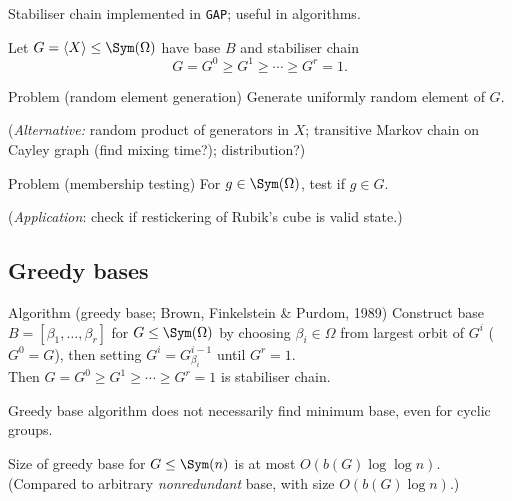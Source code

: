 \begin{slide}
    Stabiliser chain implemented in \texttt{GAP}; useful in algorithms. \pause

    Let $G = \langle X \rangle \leq \Sym(\Omega)$ have base $B$ and stabiliser chain
    $$G = G^0 \geq G^1 \geq \dotsb \geq G^r = 1.$$ \pause

    \begin{alertblock}{Problem (random element generation)}
        \vspace{0pt}
        Generate uniformly random element of $G$.

        (\textit{Alternative:} \pause random product of generators in $X$; transitive Markov chain on Cayley graph (find mixing time?); distribution?)
    \end{alertblock} \pause

    \begin{alertblock}{Problem (membership testing)}
        \vspace{0pt}
        For $g \in \Sym(\Omega)$, test if $g \in G$.

        (\textit{Application}: \pause check if restickering of Rubik's cube is valid state.)
    \end{alertblock}
\end{slide}

\subsection{Greedy bases}

\begin{slide}
    \begin{alertblock}{Algorithm (greedy base;  Brown, Finkelstein \& Purdom, 1989)}
        \vspace{0pt}
        Construct base $B = [\beta_1,\dotsc,\beta_r]$ for $G \leq \Sym(\Omega)$ by \pause choosing $\beta_i \in \Omega$ from largest orbit of $G^i$ ($G^0 = G$), then setting $G^i = G^{i-1}_{\beta_i}$ until $G^r = 1$. \\
        Then $G = G^0 \geq G^1 \geq \dotsb \geq G^r = 1$ is stabiliser chain.
    \end{alertblock} \pause

    \begin{proposition}[Blaha, 1992]
        \vspace{0pt}
        Greedy base algorithm does not necessarily find minimum base, even for cyclic groups.
    \end{proposition} \pause

    \begin{theorem}[Blaha, 1992]
        \vspace{0pt}
        Size of greedy base for $G \leq \Sym(n)$ is at most $O(b(G)\log\log n)$. \pause \\
        (Compared to arbitrary \textit{nonredundant} base, with size $O(b(G)\log n)$.)
    \end{theorem}
\end{slide}

